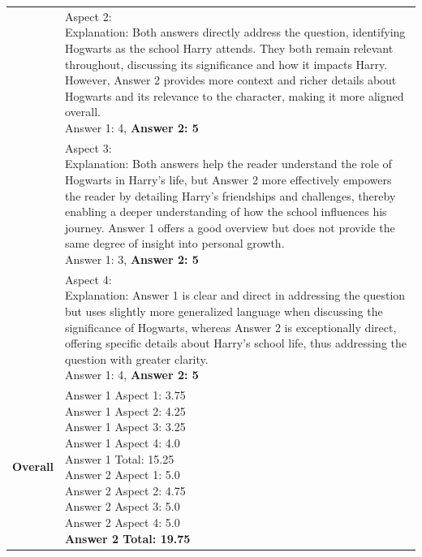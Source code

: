\begin{table}
\begin{tabular}{|p{}|p{}|}
 & \parbox{0.85\textwidth}{
 \vspace{0.3cm} 
 Aspect 2: \\
 Explanation: Both answers directly address the question, identifying Hogwarts as the school Harry attends. They both remain relevant throughout, discussing its significance and how it impacts Harry. However, Answer 2 provides more context and richer details about Hogwarts and its relevance to the character, making it more aligned overall. \\
 Answer 1: 4, \textbf{Answer 2: 5}} \\

 & \parbox{0.85\textwidth}{
 \vspace{0.3cm} 
 Aspect 3:\\
 Explanation: Both answers help the reader understand the role of Hogwarts in Harry's life, but Answer 2 more effectively empowers the reader by detailing Harry's friendships and challenges, thereby enabling a deeper understanding of how the school influences his journey. Answer 1 offers a good overview but does not provide the same degree of insight into personal growth.\\
 Answer 1: 3, \textbf{Answer 2: 5}} \\

 & \parbox{0.85\textwidth}{
 \vspace{0.3cm} 
 Aspect 4: \\
 Explanation: Answer 1 is clear and direct in addressing the question but uses slightly more generalized language when discussing the significance of Hogwarts, whereas Answer 2 is exceptionally direct, offering specific details about Harry's school life, thus addressing the question with greater clarity. \\
 Answer 1: 4, \textbf{Answer 2: 5} \vspace{0.3cm} }\\
\hline
\textbf{Overall} & \parbox{0.85\textwidth}{
\vspace{0.3cm} 
Answer 1 Aspect 1: 3.75\\
Answer 1 Aspect 2: 4.25 \\
Answer 1 Aspect 3: 3.25\\
Answer 1 Aspect 4: 4.0 \\
Answer 1 Total: 15.25  \vspace{0.3cm}\\
Answer 2 Aspect 1: 5.0   \\
Answer 2 Aspect 2: 4.75 \\
Answer 2 Aspect 3: 5.0  \\
Answer 2 Aspect 4: 5.0 \\
\textbf{Answer 2 Total: 19.75}} \vspace{0.2cm} \\
 
\hline
\end{tabular}
\end{table}

